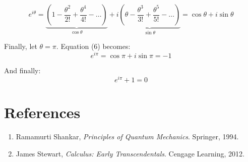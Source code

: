 \documentclass[11pt]{article}
\begin{document}
\begin{equation}
    e^{i\theta} =
\underbrace{\left(1 - \frac{\theta^2}{2!} + \frac{\theta^4}{4!} - \ldots\right)}_{\cos\theta}
+ i\underbrace{\left(\theta - \frac{\theta^3}{3!} + \frac{\theta^5}{5!} - \ldots\right)}_{\sin\theta}
= \cos\theta + i\sin\theta
\end{equation}

Finally, let $\theta = \pi$. Equation (6) becomes:
\begin{equation*}
    {e^{i\pi }} = \cos \pi  + i\sin \pi  =  - 1
\end{equation*}

And finally:
\begin{equation*}
    \boxed{e^{i\pi} + 1 = 0}
\end{equation*}


\section*{References}
\begin{enumerate}
  \item Ramamurti Shankar, \emph{Principles of Quantum Mechanics}. Springer, 1994.
  \item James Stewart, \emph{Calculus: Early Transcendentals}. Cengage Learning, 2012.
\end{enumerate}
\end{document}
